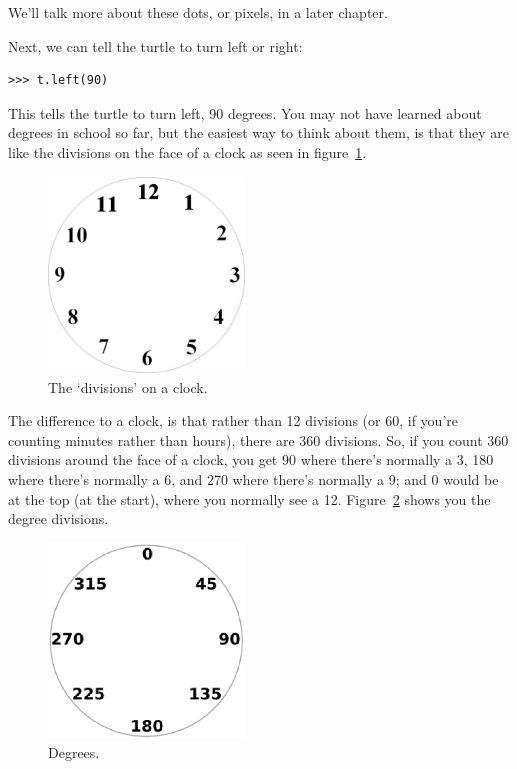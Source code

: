 We'll talk more about these dots, or pixels, in a later chapter.

Next, we can tell the turtle to turn left or right:

\begin{listing}
\begin{verbatim}
>>> t.left(90)
\end{verbatim}
\end{listing}

This tells the turtle to turn left, 90 degrees.  You may not have learned about degrees in school so far, but the easiest way to think about them, is that they are like the divisions on the face of a clock as seen in figure~\ref{fig13}.

\begin{figure}
\begin{center}
\includegraphics[width=52mm]{eps/figure13.eps}
\end{center}
\caption{The `divisions' on a clock.}\label{fig13}
\end{figure}

The difference to a clock, is that rather than 12 divisions (or 60, if you're counting minutes rather than hours), there are 360 divisions.  So, if you count 360 divisions around the face of a clock, you get 90 where there's normally a 3, 180 where there's normally a 6, and 270 where there's normally a 9; and 0 would be at the top (at the start), where you normally see a 12.  Figure~\ref{fig14} shows you the degree divisions.

\begin{figure}
\begin{center}
\includegraphics[width=52mm]{eps/figure14.eps}
\end{center}
\caption{Degrees.}\label{fig14}
\end{figure}

